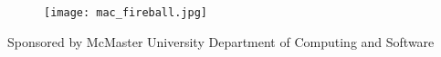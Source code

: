 \documentclass[11pt,fleqn]{book} %
\begin{document}



\begin{figure}[h]
	\centering\texttt{[image: mac\_fireball.jpg]}
	\label{fig:fireball} %
\end{figure}

\centering
Sponsored by McMaster University Department of Computing and Software
\end{document}
